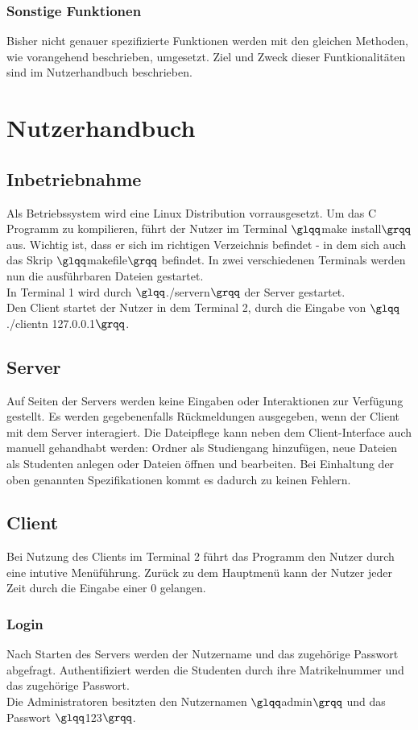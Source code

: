 \documentclass{scrartcl}
\begin{document}
		\subsubsection{Sonstige Funktionen}
			Bisher nicht genauer spezifizierte Funktionen werden mit den gleichen Methoden, wie vorangehend beschrieben, umgesetzt. Ziel und Zweck dieser Funtkionalitäten sind im Nutzerhandbuch beschrieben.
\section{Nutzerhandbuch}
	\subsection{Inbetriebnahme}
		Als Betriebssystem wird eine Linux Distribution vorrausgesetzt. Um das C Programm zu kompilieren, führt der Nutzer im Terminal $\glqq$make install$\grqq$ aus. Wichtig ist, dass er sich im richtigen Verzeichnis befindet - in dem sich auch das Skrip $\glqq$makefile$\grqq$ befindet. In zwei verschiedenen Terminals werden nun die ausführbaren Dateien gestartet.\\
		In Terminal 1 wird durch $\glqq$./servern$\grqq$ der Server gestartet.\\
		Den Client startet der Nutzer in dem Terminal 2, durch die Eingabe von $\glqq$./clientn 127.0.0.1$\grqq$.
	\subsection{Server}
		Auf Seiten der Servers werden keine Eingaben oder Interaktionen zur Verfügung gestellt. Es werden gegebenenfalls Rückmeldungen ausgegeben, wenn der Client mit dem Server interagiert. Die Dateipflege kann neben dem Client-Interface auch manuell gehandhabt werden: Ordner als Studiengang hinzufügen, neue Dateien als Studenten anlegen oder Dateien öffnen und bearbeiten. Bei Einhaltung der oben genannten Spezifikationen kommt es dadurch zu keinen Fehlern.
	\subsection{Client}
		Bei Nutzung des Clients im Terminal 2 führt das Programm den Nutzer durch eine intutive Menüführung. Zurück zu dem Hauptmenü kann der Nutzer jeder Zeit durch die Eingabe einer 0 gelangen.
		\subsubsection{Login}
			Nach Starten des Servers werden der Nutzername und das zugehörige Passwort abgefragt. Authentifiziert werden die Studenten durch ihre Matrikelnummer und das zugehörige Passwort. \\
			Die Administratoren besitzten den Nutzernamen $\glqq$admin$\grqq$ und das Passwort $\glqq$123$\grqq$.
\end{document}

